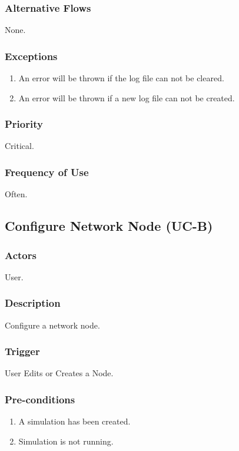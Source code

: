 \documentclass[a4paper,11pt,titlepage]{article}
\begin{document}
\subsubsection{Alternative Flows}
None.
\subsubsection{Exceptions}

\begin{enumerate}
  \item  An error will be thrown if the log file can not be cleared.
  \item  An error will be thrown if a new log file can not be created.
\end{enumerate}

\subsubsection{Priority}
Critical.

\subsubsection{Frequency of Use}
Often.

\subsection{Configure Network Node (UC-B)}
\subsubsection{Actors}
User.
\subsubsection{Description}
Configure a network node.
\subsubsection{Trigger}
User Edits or Creates a Node.
\subsubsection{Pre-conditions}

\begin{enumerate}
  \item A simulation has been created.
  \item Simulation is not running.
\end{enumerate}
\end{document}
